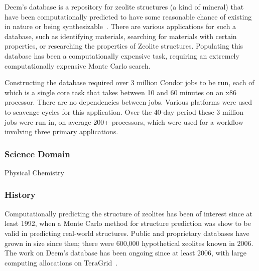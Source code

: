 \documentclass[10pt,letterpaper]{article}
\begin{document}
Deem's database is a repository for zeolite structures (a kind of mineral)
that have been computationally predicted to have some reasonable
chance of existing in nature or being synthesizable~\cite{deem-2009}.  There are various applications
for such a database, such as identifying materials, searching for materials with
certain properties, or researching the properties of Zeolite structures.  Populating this
database has been a computationally expensive task, requiring an
extremely computationally expensive Monte Carlo search.

Constructing the database required over 3 million Condor jobs to be run,
each of which is a single
core task that takes between 10 and 60 minutes on an x86 processor.
There are no dependencies between jobs.  Various 
platforms were used to scavenge cycles for this application.
Over the 40-day period these 3 million jobs were run in, on average
200+ processors, which were used for a workflow involving three primary
applications.

\subsubsection{Science Domain} Physical Chemistry

\subsubsection{History}
Computationally predicting the structure of zeolites has been of interest since at least 1992,
when a Monte Carlo method for structure prediction was show to be valid in predicting real-world structures. 
Public and proprietary databases have grown in size since then; there
were 600,000 hypothetical zeolites known in 2006. The work on Deem's database has been ongoing since at least 2006, with large computing allocations on TeraGrid~\cite{deem-2009}.
\end{document}
